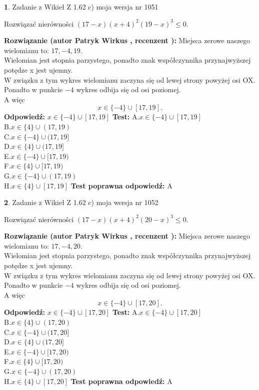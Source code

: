 \documentclass[12pt, a4paper]{article}
\theoremstyle{definition} %
\newtheorem{zad}{}
\newcommand{\zadStart}[1]{\begin{zad}#1\newline}
\newcommand{\zadStop}{\end{zad}}
\newcommand{\rozwStart}[2]{\noindent \textbf{Rozwiązanie (autor #1 , recenzent #2): }\newline}
\newcommand{\rozwStop}{\newline}
\newcommand{\odpStart}{\noindent \textbf{Odpowiedź:}\newline}
\newcommand{\odpStop}{\newline}
\newcommand{\testStart}{\noindent \textbf{Test:}\newline}
\newcommand{\testStop}{\newline}
\newcommand{\kluczStart}{\noindent \textbf{Test poprawna odpowiedź:}\newline}
\newcommand{\kluczStop}{\newline}
\begin{document}
\zadStart{Zadanie z Wikieł Z 1.62 c) moja wersja nr 1051}

Rozwiązać nierówności $(17-x)(x+4)^{2}(19-x)^{3}\le0$.
\zadStop
\rozwStart{Patryk Wirkus}{}
Miejsca zerowe naszego wielomianu to: $17, -4, 19$.\\
Wielomian jest stopnia parzystego, ponadto znak współczynnika przy\linebreak najwyższej potędze x jest ujemny.\\ W związku z tym wykres wielomianu zaczyna się od lewej strony powyżej osi OX.\\
Ponadto w punkcie $-4$ wykres odbija się od osi poziomej.\\
A więc $$x \in \{-4\} \cup [17,19].$$
\rozwStop
\odpStart
$x \in \{-4\} \cup [17,19]$
\odpStop
\testStart
A.$x \in \{-4\} \cup [17,19]$\\
B.$x \in \{4\} \cup (17,19)$\\
C.$x \in \{-4\} \cup (17,19]$\\
D.$x \in \{4\} \cup (17,19]$\\
E.$x \in \{-4\} \cup [17,19)$\\
F.$x \in \{4\} \cup [17,19)$\\
G.$x \in \{-4\} \cup (17,19)$\\
H.$x \in \{4\} \cup [17,19]$
\testStop
\kluczStart
A
\kluczStop



\zadStart{Zadanie z Wikieł Z 1.62 c) moja wersja nr 1052}

Rozwiązać nierówności $(17-x)(x+4)^{2}(20-x)^{3}\le0$.
\zadStop
\rozwStart{Patryk Wirkus}{}
Miejsca zerowe naszego wielomianu to: $17, -4, 20$.\\
Wielomian jest stopnia parzystego, ponadto znak współczynnika przy\linebreak najwyższej potędze x jest ujemny.\\ W związku z tym wykres wielomianu zaczyna się od lewej strony powyżej osi OX.\\
Ponadto w punkcie $-4$ wykres odbija się od osi poziomej.\\
A więc $$x \in \{-4\} \cup [17,20].$$
\rozwStop
\odpStart
$x \in \{-4\} \cup [17,20]$
\odpStop
\testStart
A.$x \in \{-4\} \cup [17,20]$\\
B.$x \in \{4\} \cup (17,20)$\\
C.$x \in \{-4\} \cup (17,20]$\\
D.$x \in \{4\} \cup (17,20]$\\
E.$x \in \{-4\} \cup [17,20)$\\
F.$x \in \{4\} \cup [17,20)$\\
G.$x \in \{-4\} \cup (17,20)$\\
H.$x \in \{4\} \cup [17,20]$
\testStop
\kluczStart
A
\kluczStop
\end{document}
